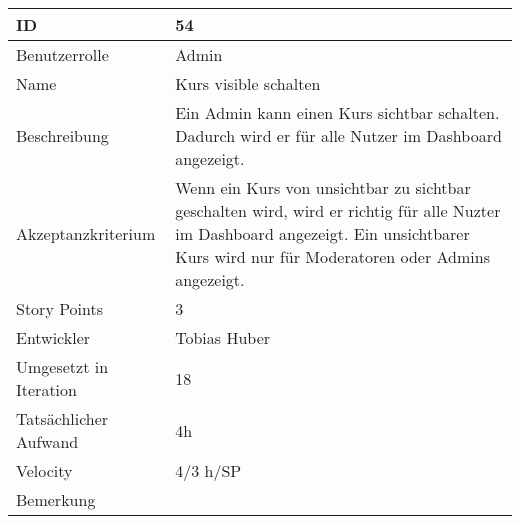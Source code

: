 \begin{tabularx}{\textwidth}{|p{}|X|}
	\hline
	ID & 54\\
	\hline
	Benutzerrolle & Admin\\
	\hline
	Name & Kurs visible schalten\\
	\hline
	Beschreibung & Ein Admin kann einen Kurs sichtbar schalten. Dadurch wird er für alle Nutzer im Dashboard angezeigt.\\
	\hline
	Akzeptanzkriterium & Wenn ein Kurs von unsichtbar zu sichtbar geschalten wird, wird er richtig für alle Nuzter im Dashboard angezeigt. Ein unsichtbarer Kurs wird nur für Moderatoren oder Admins angezeigt.\\
	\hline
	Story Points & 3\\
	\hline
	Entwickler & Tobias Huber\\
	\hline
	Umgesetzt in Iteration & 18\\
	\hline
	Tatsächlicher Aufwand & 4h\\
	\hline
	Velocity & 4/3 h/SP\\
	\hline
	Bemerkung & \\
	\hline
\end{tabularx}
\vspace{20pt}
